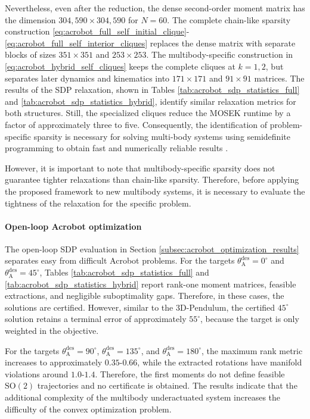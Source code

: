 Nevertheless, even after the reduction,
the dense second-order moment matrix has the dimension $304{,}590\times304{,}590$ for $N=60$.
The complete chain-like sparsity construction \eqref{eq:acrobot_full_self_initial_clique}-
\eqref{eq:acrobot_full_self_interior_cliques} replaces the dense 
matrix with separate blocks of sizes $351\times351$ and $253\times253$.
The multibody-specific construction in \eqref{eq:acrobot_hybrid_self_cliques} 
keeps the complete cliques at $k=1,2$,
but separates later dynamics and kinematics into $171\times171$ and $91\times91$ matrices.
The results of the SDP relaxation, shown in Tables \ref{tab:acrobot_sdp_statistics_full} and
\ref{tab:acrobot_sdp_statistics_hybrid},
identify similar relaxation metrics for both structures.
Still, the specialized cliques reduce the MOSEK runtime by a factor of approximately three to five.
Consequently, the identification of problem-specific sparsity is necessary 
for solving multi-body systems using semidefinite programming to obtain 
fast and numerically reliable results \cite{Kang_2025Global}. 

However, it is important to note that multibody-specific sparsity does not guarantee tighter relaxations 
than chain-like sparsity. Therefore, before applying the proposed framework to new multibody systems, 
it is necessary to evaluate the tightness of the relaxation for the specific problem.

\paragraph{Open-loop Acrobot optimization}
The open-loop SDP evaluation in Section \ref{subsec:acrobot_optimization_results} 
separates easy from difficult Acrobot problems.
For the targets $\theta_{\mathrm A}^{\mathrm{des}}=0^\circ$ and
$\theta_{\mathrm A}^{\mathrm{des}}=45^\circ$,
Tables \ref{tab:acrobot_sdp_statistics_full} and \ref{tab:acrobot_sdp_statistics_hybrid} report 
rank-one moment matrices, feasible extractions, and negligible suboptimality gaps.
Therefore, in these cases, the solutions are certified.
However, similar to the 3D-Pendulum, the certified $45^\circ$ solution retains a terminal 
error of approximately $55^\circ$, because the target is only weighted in the objective.

For the targets $\theta_{\mathrm A}^{\mathrm{des}}=90^\circ$,
$\theta_{\mathrm A}^{\mathrm{des}}=135^\circ$, and
$\theta_{\mathrm A}^{\mathrm{des}}=180^\circ$,
the maximum rank metric increases to approximately $0.35$-$0.66$,
while the extracted rotations have manifold violations around $1.0$-$1.4$.
Therefore, the first moments do not define feasible $\mathrm{SO}(2)$ trajectories
and no certificate is obtained. The results indicate that the additional complexity of the multibody
underactuated system increases the difficulty of the convex optimization problem.

